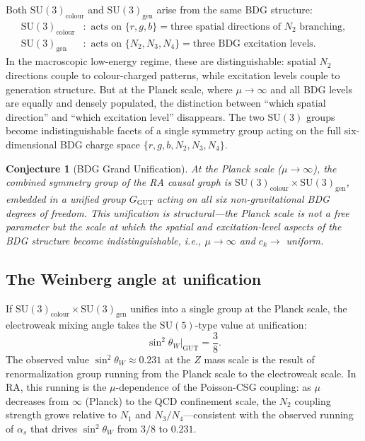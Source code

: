 \documentclass[11pt]{article}
\newtheorem{conjecture}{Conjecture}
\begin{document}
Both $\mathrm{SU}(3)_{\mathrm{colour}}$ and $\mathrm{SU}(3)_{\mathrm{gen}}$ arise from the same BDG structure:
\begin{align}
\mathrm{SU}(3)_{\mathrm{colour}} &: \text{ acts on } \{r,g,b\}=\text{three spatial directions of }N_2\text{ branching},\\
\mathrm{SU}(3)_{\mathrm{gen}} &: \text{ acts on } \{N_2,N_3,N_4\}=\text{three BDG excitation levels}.
\end{align}
In the macroscopic low-energy regime, these are distinguishable: spatial $N_2$ directions couple to colour-charged patterns, while excitation levels couple to generation structure. But at the Planck scale, where $\mu\to\infty$ and all BDG levels are equally and densely populated, the distinction between ``which spatial direction'' and ``which excitation level'' disappears. The two $\mathrm{SU}(3)$ groups become indistinguishable facets of a single symmetry group acting on the full six-dimensional BDG charge space $\{r,g,b,N_2,N_3,N_4\}$.

\begin{conjecture}[BDG Grand Unification]
At the Planck scale ($\mu\to\infty$), the combined symmetry group of the RA causal graph is $\mathrm{SU}(3)_{\mathrm{colour}}\times\mathrm{SU}(3)_{\mathrm{gen}}$, embedded in a unified group $G_{\mathrm{GUT}}$ acting on all six non-gravitational BDG degrees of freedom. This unification is structural---the Planck scale is not a free parameter but the scale at which the spatial and excitation-level aspects of the BDG structure become indistinguishable, i.e., $\mu\to\infty$ and $c_k\to$ uniform.
\end{conjecture}

\subsection{The Weinberg angle at unification}

If $\mathrm{SU}(3)_{\mathrm{colour}}\times\mathrm{SU}(3)_{\mathrm{gen}}$ unifies into a single group at the Planck scale, the electroweak mixing angle takes the $\mathrm{SU}(5)$-type value at unification:
\begin{equation}
\sin^2\theta_W\Big|_{\mathrm{GUT}} = \frac{3}{8}.
\end{equation}
The observed value $\sin^2\theta_W\approx 0.231$ at the $Z$ mass scale is the result of renormalization group running from the Planck scale to the electroweak scale. In RA, this running is the $\mu$-dependence of the Poisson-CSG coupling: as $\mu$ decreases from $\infty$ (Planck) to the QCD confinement scale, the $N_2$ coupling strength grows relative to $N_1$ and $N_3/N_4$---consistent with the observed running of $\alpha_s$ that drives $\sin^2\theta_W$ from $3/8$ to $0.231$.
\end{document}
